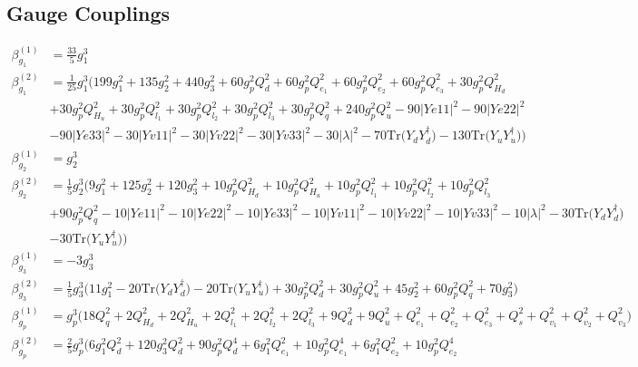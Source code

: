 \subsection{Gauge Couplings}
{\allowdisplaybreaks  \begin{align} 
\beta_{g_1}^{(1)} & =  
\frac{33}{5} g_{1}^{3} \\ 
\beta_{g_1}^{(2)} & =  
\frac{1}{25} g_{1}^{3} \Big(199 g_{1}^{2} +135 g_{2}^{2} +440 g_{3}^{2} +60 g_{p}^{2} Q_{d}^{2} +60 g_{p}^{2} Q_{e_{1}}^{2} +60 g_{p}^{2} Q_{e_{2}}^{2} +60 g_{p}^{2} Q_{e_3}^{2} +30 g_{p}^{2} Q_{H_d}^{2} \nonumber \\ 
 &+30 g_{p}^{2} Q_{H_u}^{2} +30 g_{p}^{2} Q_{l_1}^{2} +30 g_{p}^{2} Q_{l_2}^{2} +30 g_{p}^{2} Q_{l_3}^{2} +30 g_{p}^{2} Q_{q}^{2} +240 g_{p}^{2} Q_{u}^{2} -90 |Ye11|^2 -90 |Ye22|^2 \nonumber \\ 
 &-90 |Ye33|^2 -30 |Yv11|^2 -30 |Yv22|^2 -30 |Yv33|^2 -30 |\lambda|^2 -70 \mbox{Tr}\Big({Y_d  Y_{d}^{\dagger}}\Big) -130 \mbox{Tr}\Big({Y_u  Y_{u}^{\dagger}}\Big) \Big)\\ 
\beta_{g_2}^{(1)} & =  
g_{2}^{3}\\ 
\beta_{g_2}^{(2)} & =  
\frac{1}{5} g_{2}^{3} \Big(9 g_{1}^{2} +125 g_{2}^{2} +120 g_{3}^{2} +10 g_{p}^{2} Q_{H_d}^{2} +10 g_{p}^{2} Q_{H_u}^{2} +10 g_{p}^{2} Q_{l_1}^{2} +10 g_{p}^{2} Q_{l_2}^{2} +10 g_{p}^{2} Q_{l_3}^{2} \nonumber \\ 
 &+90 g_{p}^{2} Q_{q}^{2} -10 |Ye11|^2 -10 |Ye22|^2 -10 |Ye33|^2 -10 |Yv11|^2 -10 |Yv22|^2 -10 |Yv33|^2 -10 |\lambda|^2 -30 \mbox{Tr}\Big({Y_d  Y_{d}^{\dagger}}\Big) \nonumber \\ 
 &-30 \mbox{Tr}\Big({Y_u  Y_{u}^{\dagger}}\Big) \Big)\\ 
\beta_{g_3}^{(1)} & =  
-3 g_{3}^{3} \\ 
\beta_{g_3}^{(2)} & =  
\frac{1}{5} g_{3}^{3} \Big(11 g_{1}^{2}  -20 \mbox{Tr}\Big({Y_d  Y_{d}^{\dagger}}\Big)  -20 \mbox{Tr}\Big({Y_u  Y_{u}^{\dagger}}\Big)  + 30 g_{p}^{2} Q_{d}^{2}  + 30 g_{p}^{2} Q_{u}^{2}  + 45 g_{2}^{2}  + 60 g_{p}^{2} Q_{q}^{2}  + 70 g_{3}^{2} \Big)\\ 
\beta_{g_p}^{(1)} & =  
g_{p}^{3} \Big(18 Q_{q}^{2}  + 2 Q_{H_d}^{2}  + 2 Q_{H_u}^{2}  + 2 Q_{l_1}^{2}  + 2 Q_{l_2}^{2}  + 2 Q_{l_3}^{2}  + 9 Q_{d}^{2}  + 9 Q_{u}^{2}  + Q_{e_{1}}^{2} + Q_{e_{2}}^{2} + Q_{e_3}^{2} + Q_{s}^{2} + Q_{v_1}^{2} + Q_{v_2}^{2} + Q_{v_3}^{2}\Big)\\ 
\beta_{g_p}^{(2)} & =  
\frac{2}{5} g_{p}^{3} \Big(6 g_{1}^{2} Q_{d}^{2} +120 g_{3}^{2} Q_{d}^{2} +90 g_{p}^{2} Q_{d}^{4} +6 g_{1}^{2} Q_{e_{1}}^{2} +10 g_{p}^{2} Q_{e_{1}}^{4} +6 g_{1}^{2} Q_{e_{2}}^{2} +10 g_{p}^{2} Q_{e_{2}}^{4} \nonumber \\ 

\end{align}}
